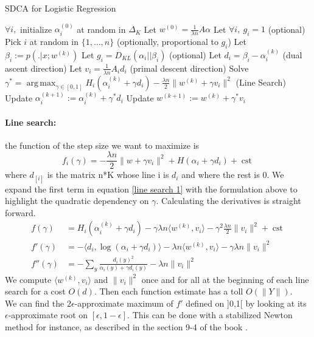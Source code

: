\documentclass{article}
\DeclareMathOperator{\cst}{cst}
\DeclareMathOperator{\1}{\mathbb{1}}
\DeclareMathOperator*{\argmax}{arg\,max}
\begin{document}
\begin{algorithm}[ht]
    \caption{SDCA for Logistic Regression}%
    \label{sdca for logreg}
\begin{algorithmic}
        \STATE $\forall i,$ initialize $\alpha_i^{(0)}$ at random in $\Delta_K$
        \STATE Let $w^{(0)} = \frac{1}{\lambda n} A \alpha$  
        \STATE Let $\forall i,\  g_i = 1$ (optional)
                \STATE Pick $i$ at random in $\{1,\ldots,n\}$ (optionally, proportional to $g_i$)
                \STATE Let $ \beta_i := p( . |x ; w^{(k)})$
                \STATE Let $g_i = D_{KL}(\alpha_i || \beta_i)$ (optional)
                \STATE Let $d_i = \beta_i - \alpha_i^{(k)}$ (dual ascent direction)
                \STATE Let $v_i = \frac{1}{\lambda n} A_i d_i $ (primal descent direction)
                \STATE Solve $\gamma^* = \argmax_{\gamma \in [0,1]} H_i(\alpha_i^{(k)} + \gamma d_i) - \frac{\lambda n}{2} \| w^{(k)} + \gamma v_i \|^2$ (Line Search)
               \STATE Update $\alpha_i^{(k+1)} := \alpha_i^{(k)} + \gamma^* d_i$
               \STATE Update $w^{(k+1)} := w^{(k)} + \gamma^* v_i $
        \ENDFOR
\end{algorithmic}
\end{algorithm}


\paragraph{Line search:} 
the function of the step size we want to maximize is 
\begin{equation}
	\label{line search 1}
	f_i(\gamma) = -\frac{\lambda n}{2} \|w + \gamma v_i\|^2 + H(\alpha_i + \gamma d_i) + \cst
\end{equation}
where $d_{[i]}$ is the matrix n*K whose line i is $d_i$ and where the rest is 0.
We expand the first term in equation \ref{line search 1} with the formulation above to highlight the quadratic dependency on $\gamma$.
Calculating the derivatives is straight forward.
\begin{align*}
	f(\gamma)
	& = H_i(\alpha_i^{(k)} + \gamma d_i)
	- \gamma \lambda n  \langle w^{(k)} , v_i \rangle 
	- \gamma^2 \frac{\lambda n}{2} \|v_i \|^2
	+ \cst
	\\
	f'(\gamma) & =  - \langle d_i, \log(\alpha_i + \gamma d_i) \rangle
	- \lambda n \langle w^{(k)} , v_i \rangle 
	- \gamma \lambda n \|v_i \|^2 
	\\
	f''(\gamma) & = - \sum_{y} \frac{d_{i}(y)^2 }{ \alpha_i(y) + \gamma d_i(y) }
	- \lambda n  \|v_i \|^2 
\end{align*}
We compute $\langle w^{(k)} , v_i \rangle$ and $ \|v_i \|^2$ once and for all at the beginning of each line search for a cost $O(d)$. Then each function estimate has a toll $O(\|Y\|)$.\\
We can find the $2\epsilon$-approximate maximum of $f'$ defined on ]0,1[ by looking at its $\epsilon$-approximate root on $[\epsilon,1-\epsilon]$.
This can be done with a stabilized Newton method for instance, as described in the section 9-4 of the book \cite{press_numerical_1992}.
\end{document}
